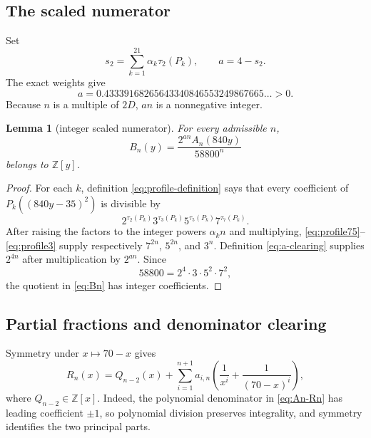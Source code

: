 \documentclass[preprint,12pt]{elsarticle}
\newtheorem{lemma}[theorem]{Lemma}
\theoremstyle{definition}
\newcommand{\Z}{\mathbb Z}
\begin{document}
\subsection{The scaled numerator}

Set
\begin{equation}\label{eq:a-clearing}
 s_2=\sum_{k=1}^{21}\alpha_k\tau_2(P_k),
 \qquad
 a=4-s_2.
\end{equation}
The exact weights give
\begin{equation}\label{eq:a-value}
 a=0.43339168265643340846553249867665\ldots>0.
\end{equation}
Because $n$ is a multiple of $2D$, $an$ is a nonnegative integer.

\begin{lemma}[integer scaled numerator]\label{lem:scaled-integer}
For every admissible $n$,
\begin{equation}\label{eq:Bn}
 B_n(y)=\frac{2^{an}A_n(840y)}{58800^n}
\end{equation}
belongs to $\Z[y]$.
\end{lemma}

\begin{proof}
For each $k$, definition \eqref{eq:profile-definition} says that every
coefficient of $P_k((840y-35)^2)$ is divisible by
\[
 2^{\tau_2(P_k)}3^{\tau_3(P_k)}
 5^{\tau_5(P_k)}7^{\tau_7(P_k)}.
\]
After raising the factors to the integer powers $\alpha_k n$ and multiplying,
\eqref{eq:profile75}--\eqref{eq:profile3} supply respectively
$7^{2n}$, $5^{2n}$, and $3^n$.  Definition \eqref{eq:a-clearing} supplies
$2^{4n}$ after multiplication by $2^{an}$.  Since
\[
 58800=2^4\cdot3\cdot5^2\cdot7^2,
\]
the quotient in \eqref{eq:Bn} has integer coefficients.
\end{proof}

\subsection{Partial fractions and denominator clearing}

Symmetry under $x\mapsto70-x$ gives
\begin{equation}\label{eq:partial-fraction}
 R_n(x)=Q_{n-2}(x)+
 \sum_{i=1}^{n+1}a_{i,n}
 \left(\frac1{x^i}+\frac1{(70-x)^i}\right),
\end{equation}
where $Q_{n-2}\in\Z[x]$.  Indeed, the polynomial denominator in
\eqref{eq:An-Rn} has leading coefficient $\pm1$, so polynomial division
preserves integrality, and symmetry identifies the two principal parts.
\end{document}

